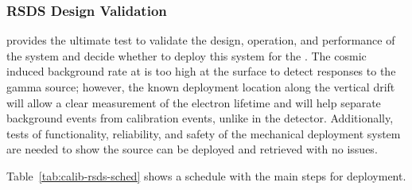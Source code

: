 


\subsubsection{RSDS Design Validation}
 provides the ultimate test to validate the design, operation, and performance of the system and decide whether to deploy this system for the . The cosmic induced background rate at  is too high at the surface to detect responses to the  gamma source; however, the known deployment location along the vertical drift will allow a clear measurement of the electron lifetime and will help separate background events from calibration events, unlike in the  detector. Additionally, tests of functionality, reliability, and safety of the mechanical deployment system are needed to show the source can be deployed and retrieved with no issues.


Table~\ref{tab:calib-rsds-sched} shows a schedule with the main steps for  deployment.

